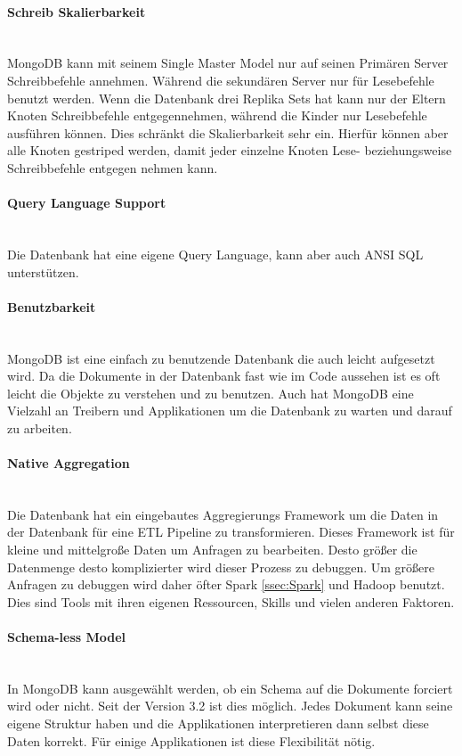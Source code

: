 \paragraph{Schreib Skalierbarkeit}\mbox{} \\
MongoDB kann mit seinem Single Master Model nur auf seinen Primären Server Schreibbefehle annehmen. Während die sekundären Server nur für Lesebefehle benutzt werden. Wenn die Datenbank drei Replika Sets hat kann nur der Eltern Knoten Schreibbefehle entgegennehmen, während die Kinder nur Lesebefehle ausführen können. Dies schränkt die Skalierbarkeit sehr ein. Hierfür können aber alle Knoten gestriped werden, damit jeder einzelne Knoten Lese- beziehungsweise Schreibbefehle entgegen nehmen kann.
\paragraph{Query Language Support}\mbox{} \\
Die Datenbank hat eine eigene Query Language, kann aber auch ANSI SQL unterstützen.
\paragraph{Benutzbarkeit}\mbox{} \\
MongoDB ist eine einfach zu benutzende Datenbank die auch leicht aufgesetzt wird. Da die Dokumente in der Datenbank fast wie im Code aussehen ist es oft leicht die Objekte zu verstehen und zu benutzen. Auch hat MongoDB eine Vielzahl an Treibern und Applikationen um die Datenbank zu warten und darauf zu arbeiten.
\paragraph{Native Aggregation}\mbox{} \\
Die Datenbank hat ein eingebautes Aggregierungs Framework um die Daten in der Datenbank für eine ETL Pipeline zu transformieren. Dieses Framework ist für kleine und mittelgroße Daten um Anfragen zu bearbeiten. Desto größer die Datenmenge desto komplizierter wird dieser Prozess zu debuggen. Um größere Anfragen zu debuggen wird daher öfter Spark \ref{ssec:Spark} und Hadoop benutzt. Dies sind Tools mit ihren eigenen Ressourcen, Skills und vielen anderen Faktoren.
\paragraph{Schema-less Model}\mbox{} \\
In MongoDB kann ausgewählt werden, ob ein Schema auf die Dokumente forciert wird oder nicht. Seit der Version 3.2 ist dies möglich. Jedes Dokument kann seine eigene Struktur haben und die Applikationen interpretieren dann selbst diese Daten korrekt. Für einige Applikationen ist diese Flexibilität nötig.

